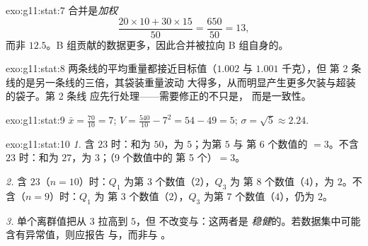\begin{solution}{exo:g11:stat:7}
合并是\emph{加权}
\[
\frac{20 \times 10 + 30 \times 15}{50} = \frac{650}{50} = 13,
\]
而非 $12.5$。B 组贡献的数据更多，因此合并被拉向
B 组自身的。
\end{solution}

\begin{solution}{exo:g11:stat:8}
两条线的平均重量都接近目标值（$1.002$ 与 $1.001$ 千克），但
第 2 条线的是另一条线的三倍，其袋装重量波动
大得多，从而明显产生更多欠装与超装的袋子。第 2 条线
应先行处理——需要修正的不只是，
而是一致性。
\end{solution}

\begin{solution}{exo:g11:stat:9}
$\bar x = \frac{70}{10} = 7$;
$V = \frac{540}{10} - 7^2 = 54 - 49 = 5$;
$\sigma = \sqrt5 \approx 2.24$.
\end{solution}

\begin{solution}{exo:g11:stat:10}
\emph{1.} 含 $23$ 时：和为 $50$，为 $5$；为第 $5$ 与
第 $6$ 个数值的 $= 3$。不含 $23$ 时：和为 $27$，为 $3$；（9 个数值中的
第 5 个）$= 3$。

\emph{2.} 含 $23$（$n = 10$）时：$Q_1$ 为第 $3$ 个数值（$2$），$Q_3$ 为
第 $8$ 个数值（$4$），为 $2$。不含（$n = 9$）时：$Q_1$ 为
第 $3$ 个数值（$2$），$Q_3$ 为第 $7$ 个数值（$4$），仍为 $2$。

\emph{3.} 单个离群值把从 $3$ 拉高到 $5$，但
不改变与：这两者是
\emph{稳健}的。若数据集中可能含有异常值，则应报告
与，而非与
。
\end{solution}

